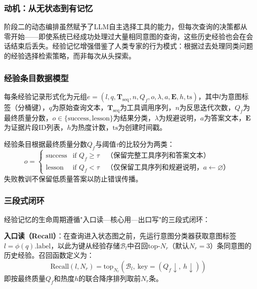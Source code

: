 \documentclass[runningheads]{llncs}
\begin{document}
\subsubsection{动机：从无状态到有记忆}

阶段二的动态编排虽然赋予了LLM自主选择工具的能力，但每次查询的决策都从零开始——即使系统已经成功处理过大量相同意图的查询，这些历史经验也会在会话结束后丢失。经验记忆增强借鉴了人类专家的行为模式：根据过去处理同类问题的经验选择检索策略，而非每次从头探索。

\subsubsection{经验条目数据模型}

每条经验记录形式化为元组$e = (l, q, \mathbf{T}_{\text{seq}}, n, Q_f, o, \lambda, a, \mathbf{E}, h, \text{ts})$，其中$l$为意图标签（分桶键），$q$为原始查询文本，$\mathbf{T}_{\text{seq}}$为工具调用序列，$n$为反思迭代次数，$Q_f$为最终质量分数，$o \in \{\text{success}, \text{lesson}\}$为结果分类，$\lambda$为规避说明，$a$为答案文本，$\mathbf{E}$为证据片段ID列表，$h$为热度计数，$\text{ts}$为创建时间戳。

经验条目根据最终质量分数$Q_f$与阈值$\tau$的比较分为两类：
\begin{equation}
    o = \begin{cases}
    \text{success} & \text{if } Q_f \geq \tau \quad \text{（保留完整工具序列和答案文本）} \\
    \text{lesson} & \text{if } Q_f < \tau \quad \text{（仅保留工具序列和规避说明，$a \leftarrow \varnothing$）}
    \end{cases}
\end{equation}
失败教训不保留低质量答案以防止错误传播。

\subsubsection{三段式闭环}

经验记忆的生命周期遵循"入口读—核心用—出口写"的三段式闭环：

\textbf{入口读（Recall）}：在查询进入状态图之前，先运行意图分类器获取意图标签$l = \phi(q).\text{label}$，以此为键从经验存储$\mathcal{B}_l$中召回top-$N_r$（默认$N_r = 3$）条同意图的历史经验。召回函数定义为：
\begin{equation}
    \text{Recall}(l, N_r) = \text{top}_{N_r}\!\left(\mathcal{B}_l,\ \text{key} = (Q_f \downarrow,\ h \downarrow)\right)
\end{equation}
即按最终质量$Q_f$和热度$h$的联合降序排列取前$N_r$条。
\end{document}
